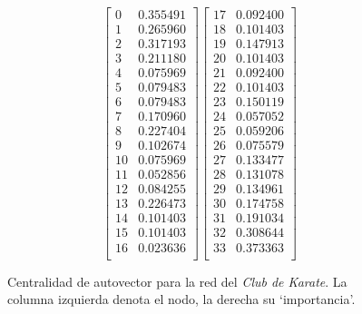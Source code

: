 \vspace{1em}
\begin{figure}[!htbp]
\begin{equation*} 
    \begin{bmatrix}
        0   &0.355491 \\
        1   &0.265960 \\
        2   &0.317193 \\
        3   &0.211180 \\
        4   &0.075969 \\
        5   &0.079483 \\
        6   &0.079483 \\
        7   &0.170960 \\
        8   &0.227404 \\
        9   &0.102674 \\
        10  &0.075969 \\
        11  &0.052856 \\
        12  &0.084255 \\
        13  &0.226473 \\
        14  &0.101403 \\
        15  &0.101403 \\
        16  &0.023636 \\
    \end{bmatrix}
    \begin{bmatrix}
        17  &0.092400 \\
        18  &0.101403 \\
        19  &0.147913 \\
        20  &0.101403 \\
        21  &0.092400 \\
        22  &0.101403 \\
        23  &0.150119 \\
        24  &0.057052 \\
        25  &0.059206 \\
        26  &0.075579 \\
        27  &0.133477 \\
        28  &0.131078 \\
        29  &0.134961 \\
        30  &0.174758 \\
        31  &0.191034 \\
        32  &0.308644 \\
        33  &0.373363 \\
    \end{bmatrix}
\end{equation*}
\caption{Centralidad de autovector para la red del \textit{Club de Karate}. La columna izquierda denota el nodo, la derecha su `importancia'.} \label{centralidad_karate}
\end{figure}

